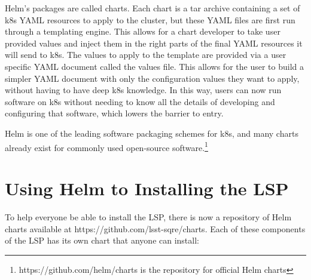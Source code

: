 \documentclass[11pt,twoside]{article}
\begin{document}
Helm's packages are called charts.  Each chart is a tar archive containing a set of
k8s YAML resources to apply to the cluster, but these YAML files are first run through
a templating engine.  This allows for a chart developer to take user provided values
and inject them in the right parts of the final YAML resources it will send to k8s.
The values to apply to the template are provided via a user specific YAML document
called the values file.
This allows for the user to build a simpler YAML document with only the configuration
values they want to apply, without having to have deep k8s knowledge.  In this way,
users can now run software on k8s without needing to know all the details of developing
and configuring that software, which lowers the barrier to entry.

Helm is one of the leading software packaging schemes for k8s, and many charts
already exist for commonly used open-source software.\footnote{https://github.com/helm/charts
is the repository for official Helm charts}

\section{Using Helm to Installing the LSP}

To help everyone be able to install the LSP, there is now a repository of Helm
charts available at https://github.com/lsst-sqre/charts.  Each of these components
of the LSP has its own chart that anyone can install:
\end{document}
